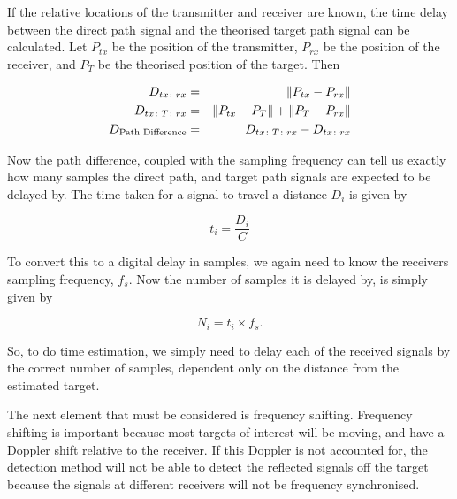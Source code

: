 \documentclass[12pt,openany,a4paper]{book}
\begin{document}
\bigskip

If the relative locations of the transmitter and receiver are known, the time delay between the direct path signal and the theorised target path signal can be calculated. Let $P_{tx}$ be the position of the transmitter, $P_{rx}$ be the position of the receiver, and $P_{T}$ be the theorised position of the target. Then

\begin{eqnarray}
\label{eqn:dtxrx}
D_{tx\colon rx} & = & \| P_{tx} - P_{rx} \| \\
\label{eqn:dtxtrx}
D_{tx\colon T\colon rx} & = & \| P_{tx} - P_{T} \| + \| P_{T} - P_{rx} \| \\
\label{eqn:PD}
D_{ \textnormal{Path Difference}} & = & D_{tx\colon T\colon rx} - D_{tx\colon rx}
\end{eqnarray}

\bigskip

Now the path difference, coupled with the sampling frequency can tell us exactly how many samples the direct path, and target path signals are expected to be delayed by. The time taken for a signal to travel a distance $D_i$ is given by 

\begin{equation}
t_i = \frac{D_i}{C}
\end{equation}

\bigskip

To convert this to a digital delay in samples, we again need to know the receivers sampling frequency, $f_s$. Now the number of samples it is delayed by, is simply given by

\begin{equation}
N_i = t_i \times f_s.
\end{equation}

\bigskip

So, to do time estimation, we simply need to delay each of the received signals by the correct number of samples, dependent only on the distance from the estimated target.

\bigskip

The next element that must be considered is frequency shifting. Frequency shifting is important because most targets of interest will be moving, and have a Doppler shift relative to the receiver. If this Doppler is not accounted for, the detection method will not be able to detect the reflected signals off the target because the signals at different receivers will not be frequency synchronised.

\bigskip
\end{document}
